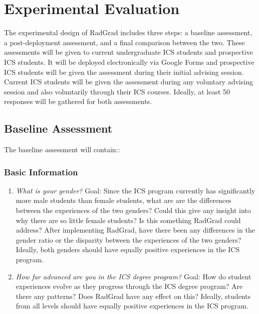 \chapter{Experimental Evaluation}
\label{experimentalEvaluation}
The experimental design of RadGrad includes three steps: a baseline assessment, a post-deployment assessment, and a final comparison between the two. These assessments will be given to current undergraduate ICS students and prospective ICS students. It will be deployed electronically via Google Forms and prospective ICS students will be given the assessment during their initial advising session. Current ICS students will be given the assessment during any voluntary advising session and also voluntarily through their ICS courses. Ideally, at least 50 responses will be gathered for both assessments.
\section{Baseline Assessment}
\label{baselineAssessment}
	The baseline assessment will contain::

\subsection{Basic Information}
\begin{enumerate}
\item \textit{What is your gender? }
Goal: Since the ICS program currently has significantly more male students than female students, what are are the differences between the experiences of the two genders? Could this give any insight into why there are so little female students? Is this something RadGrad could address? After implementing RadGrad, have there been any differences in the gender ratio or the disparity between the experiences of the two genders? Ideally, both genders should have equally positive experiences in the ICS program.
\item \textit{How far advanced are you in the ICS degree program?}
Goal: How do student experiences evolve as they progress through the ICS degree program? Are there any patterns? Does RadGrad have any effect on this? Ideally, students from all levels should have equally positive experiences in the ICS program. 
\end{enumerate}

